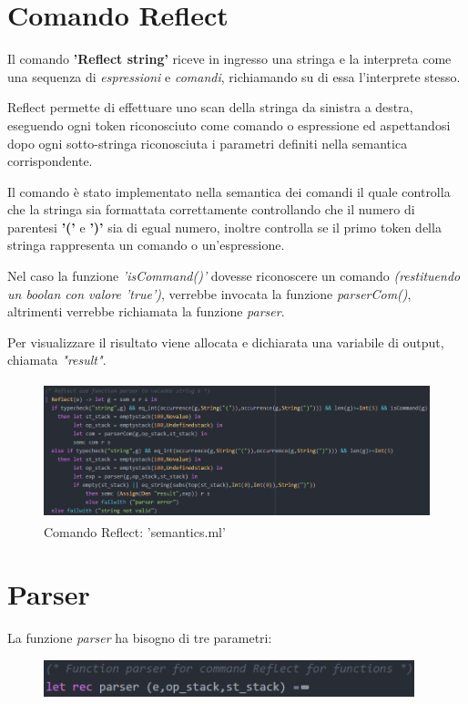 \documentclass[a4paper,titlepage]{book}
\begin{document}
\section{Comando Reflect}
Il comando \textbf{'Reflect string'} riceve in ingresso una stringa e la interpreta come una sequenza di \textit{espressioni} e \textit{comandi}, richiamando su di essa l'interprete stesso.

Reflect permette di effettuare uno scan della stringa da sinistra a destra, eseguendo ogni token riconosciuto come comando o espressione ed aspettandosi dopo ogni sotto-stringa riconosciuta i parametri definiti nella semantica corrispondente.

Il comando \`e stato implementato nella semantica dei comandi il quale controlla che la stringa sia formattata correttamente controllando che il numero di parentesi \textbf{'('} e \textbf{')'} sia di egual numero, inoltre controlla se il primo token della stringa rappresenta un comando o un'espressione.

Nel caso la funzione \textit{'isCommand()'} dovesse riconoscere un comando \textit{(restituendo un boolan con valore 'true')}, verrebbe invocata la funzione \textit{parserCom()}, altrimenti verrebbe richiamata la funzione \textit{parser}.

Per visualizzare il risultato viene allocata e dichiarata una variabile di output, chiamata \textit{"result"}.

\begin{figure}[H]
\includegraphics[height=150px]{img/reflect.png}
\caption{Comando Reflect: 'semantics.ml' \label{fig:reflect}}
\end{figure}

\section{Parser}
La funzione \textit{parser} ha bisogno di tre parametri:

\begin{figure}[H]
\includegraphics[height=40px]{img/parser.png}
\end{figure}
\end{document}
